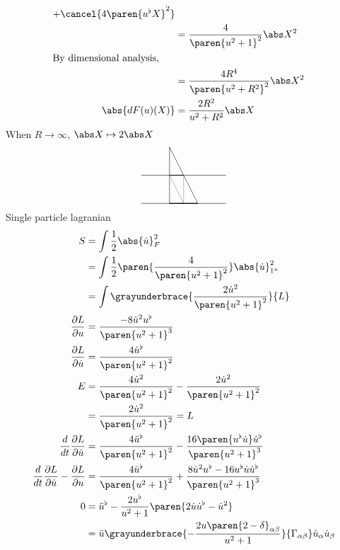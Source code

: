 \documentclass{scrartcl}
\begin{document}
\begin{multicols*}{2}
\begin{align*}
{\begin{matrix}
                         + \cancel{4 \paren{u^\flat X}^2}
                       \end{matrix}
                       } \\
         &= \frac{4}{\paren{u^2+1}^2} \abs X^2\\
    \intertext{By dimensional analysis,}
    &= \frac{4 R^4}{\paren{u^2+R^2}^2} \abs X^2\\
      \abs{dF(u)(X)} &= \frac{2 R^2}{ u^2 + R^2}\abs X
  \end{align*}
  When \(R\to\infty\), \(\abs X \mapsto 2\abs X\)
  \[
    \begin{tikzpicture}
      \draw(0,1) -- (0,-1);
      \draw(-1,0) -- (2,0);
      \draw(-1,-1) -- (2,-1);
      \draw (0,1) -- (1,-1);
      \draw[gray] (.5,0) -- (.5,-1) (0,0) -- (.5,-1);
      \draw[thick] (0,0) -- (.5,0)
      (0,-1)--(.5,-1) (.5,-1)--(1,-1);
    \end{tikzpicture}
  \]
  Single particle lagranian
  \begin{align*}
    S&= \int \frac12  \abs {\dot u}_{F} ^2 \\
     &= \int \frac12 \paren{\frac{4}{\paren{u^2+1}^2}} \abs{\dot u}_{\R^n}^2 \\
     &=\int \grayunderbrace{\frac{2\dot u^2}{\paren{u^2+1}^2}}{L}  \\
    \frac{\partial L}{\partial u}&=\frac{-8\dot u^2u^\flat}{\paren{u^2+1}^3} \\
    \frac{\partial L}{\partial \dot u}&= \frac{4\dot u^\flat}{\paren{u^2+1}^2} \\
    E&= \frac{4\dot u^2 }{\paren{u^2+1}^2} - \frac {2\dot u^2}{\paren{u^2+1}^2} \\
     &= \frac{2\dot u^2}{\paren{u^2+1}^2} = L \\
    \frac{d}{dt}\frac{\partial L}{\partial \dot u}
     &=  \frac{4\ddot u^\flat}{\paren{u^2+1}^2} - \frac{16 \paren{u^\flat \dot u}\dot u^\flat}{\paren{u^2+1}^3} \\
    \frac{d}{dt}\frac{\partial L}{\partial \dot u}-\frac{\partial L}{\partial u}&=\frac{4\ddot u^\flat}{\paren{u^2+1}^2} + \frac{8\dot u^2 u^\flat - 16 u^\flat\dot u \dot u^\flat}{\paren{u^2+1}^3} \\
    0&= \ddot u^\flat - \frac{2u^\flat}{u^2+1}\paren{2  \dot u \dot u^\flat-\dot u^2} \\
    &= \ddot u \grayunderbrace{- \frac{2u\paren{2-\delta}_{\alpha\beta}}{u^2+1}}{\Gamma_{\alpha\beta}} \dot u_\alpha\dot u_\beta
  \end{align*}
  \vfil

\end{multicols*}
\end{document}
